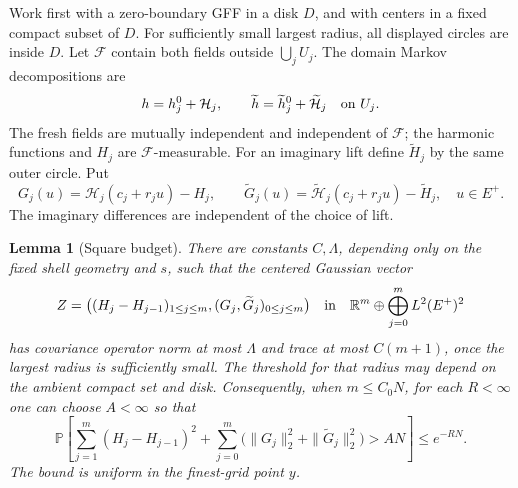 \documentclass[11pt]{article}
\numberwithin{equation}{section}
\newtheorem{lemma}[theorem]{Lemma}
\theoremstyle{definition}
\theoremstyle{remark}
\newcommand{\1}{\mathbf 1}
\begin{document}
Work first with a zero-boundary GFF in a disk \(D\), and with
centers in a fixed compact subset of \(D\).  For sufficiently small
largest radius, all displayed circles are inside \(D\).
Let \(\mathcal F\) contain both fields outside \(\bigcup_jU_j\).
The domain Markov decompositions are
\[
 h=h_j^0+\mathcal H_j,\qquad
 \widetilde h=\widetilde h_j^0+\widetilde{\mathcal H}_j
 \quad\hbox{on }U_j.
\]
The fresh fields are mutually independent and independent of
\(\mathcal F\); the harmonic functions and \(H_j\) are
\(\mathcal F\)-measurable.  For an imaginary lift define
\(\widetilde H_j\) by the same outer circle.  Put
\[
 G_j(u)=\mathcal H_j(c_j+r_ju)-H_j,\qquad
 \widetilde G_j(u)=
   \widetilde{\mathcal H}_j(c_j+r_ju)-\widetilde H_j,
 \quad u\in E^+.
\]
The imaginary differences are independent of the choice of lift.

\begin{lemma}[Square budget]\label{ann:gaussian-budget}
There are constants \(C,\Lambda\), depending only on the fixed
shell geometry and \(s\), such that the centered Gaussian vector
\[
 Z=\bigl((H_j-H_{j-1})_{1\le j\le m},
              (G_j,\widetilde G_j)_{0\le j\le m}\bigr)
 \quad\hbox{in}\quad
 \mathbb R^m\oplus\bigoplus_{j=0}^m L^2(E^+)^2
\]
has covariance operator norm at most \(\Lambda\) and trace at most
\(C(m+1)\), once the largest radius is sufficiently small.
The threshold for that radius may depend on the ambient compact set
and disk.  Consequently, when \(m\le C_0N\), for each \(R<\infty\)
one can choose \(A<\infty\) so that
\begin{equation}
 \mathbb P\left[
  \sum_{j=1}^m(H_j-H_{j-1})^2+
  \sum_{j=0}^m\bigl(\|G_j\|_2^2+\|\widetilde G_j\|_2^2\bigr)
       >AN\right]\le e^{-RN}.
 \label{ann:square-tail}
\end{equation}
The bound is uniform in the finest-grid point \(y\).
\end{lemma}
\end{document}
